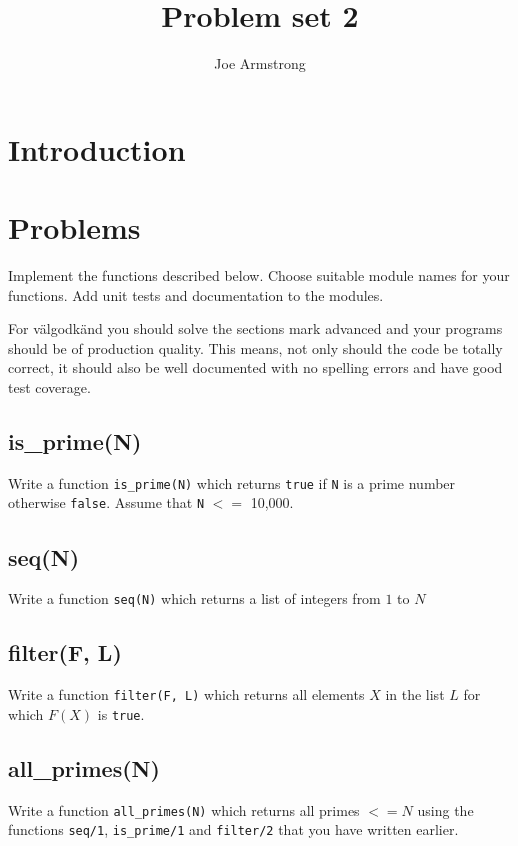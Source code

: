 \documentclass[12pt]{hitec}
\title{Problem set 2}
\author{Joe Armstrong}
\begin{document}
\maketitle

\tableofcontents

\section{Introduction}

\section{Problems}

Implement the functions described below. Choose suitable module names
for your functions. Add unit tests and documentation to the modules.

For v\"{a}lgodk\"{a}nd you should solve the sections mark advanced and
your programs should be of production quality. This means, not only
should the code be totally correct, it should also be well documented
with no spelling errors and have good test coverage.


\subsection{is\_prime(N)}

Write a function \verb+is_prime(N)+ which returns \verb+true+ if
\verb+N+ is a prime number otherwise \verb+false+. Assume that
\verb+N+ $<=$ 10,000.

\subsection{seq(N)}
Write a function \verb+seq(N)+ which returns a list of integers from
$1$ to $N$

\subsection{filter(F, L)}

Write a function \verb+filter(F, L)+ which returns all elements $X$ in
the list $L$ for which $F(X)$ is \verb+true+.

\subsection {all\_primes(N)}

Write a function \verb+all_primes(N)+ which returns
all primes $<= N$ using the functions \verb+seq/1+,
\verb+is_prime/1+ and \verb+filter/2+ that you have written earlier.
\end{document}
